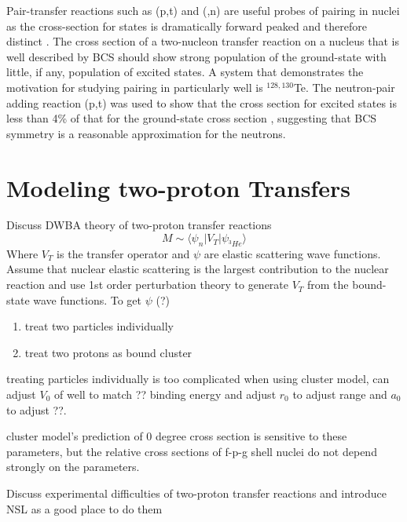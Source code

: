 Pair-transfer reactions such as (p,t) and (,n) are useful probes of pairing in nuclei as the cross-section for \zp states is dramatically forward peaked and therefore distinct \cite{Yoshida}.  The cross section of a two-nucleon transfer reaction on a nucleus that is well described by BCS should show strong population of the \zp ground-state with little, if any, population of \zp excited states.  A system that demonstrates the motivation for studying pairing in  particularly well is $^{128,130}$Te.  The neutron-pair adding reaction (p,t) was used to show that the cross section for excited \zp states is less than 4\% of that for the ground-state \zp cross section \cite{neutronPairsTellurium}, suggesting that BCS symmetry is a reasonable approximation for the neutrons.    

\section{Modeling two-proton Transfers}
Discuss DWBA theory of two-proton transfer reactions
\begin{equation}
M\sim\langle\psi_n|V_T|\psi_{^3He}\rangle
\end{equation}
Where $V_T$ is the transfer operator and $\psi$ are elastic scattering wave functions.
Assume that nuclear elastic scattering is the largest contribution to the nuclear reaction and use 1st order perturbation theory to generate $V_T$ from the bound-state wave functions.
To get $\psi$ (?)
\begin{enumerate}
\item treat two particles individually
\item treat two protons as bound cluster
\end{enumerate}
treating particles individually is too complicated
when using cluster model, can adjust $V_0$ of well to match ?? binding energy and adjust $r_0$ to adjust range and $a_0$ to adjust ??.

cluster model's prediction of 0 degree cross section is sensitive to these parameters, but the relative cross sections of f-p-g shell nuclei do not depend strongly on the parameters.

Discuss experimental difficulties of two-proton transfer reactions and introduce NSL as a good place to do them

%
% 
% 
